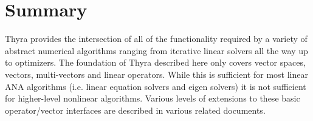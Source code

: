 \documentclass[pdf,ps2pdf,11pt]{SANDreport}
\begin{document}
%
%
%
%
%

%
\section{Summary}
%

Thyra provides the intersection of all of the functionality required by a
variety of abstract numerical algorithms ranging from iterative linear solvers
all the way up to optimizers.  The foundation of Thyra described here only
covers vector spaces, vectors, multi-vectors and linear operators.  While this
is sufficient for most linear ANA algorithms (i.e. linear equation solvers and
eigen solvers) it is not sufficient for higher-level nonlinear algorithms.
Various levels of extensions to these basic operator/vector interfaces are
described in various related documents.
\end{document}
